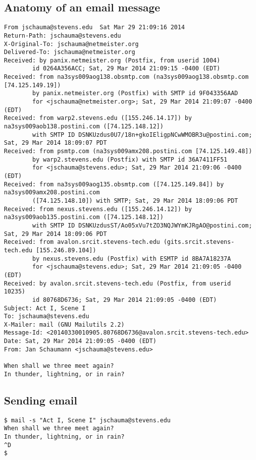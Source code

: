 \documentclass[xga]{xdvislides}
\begin{document}
\subsection{Anatomy of an email message}
\small
\begin{verbatim}
From jschauma@stevens.edu  Sat Mar 29 21:09:16 2014
Return-Path: jschauma@stevens.edu
X-Original-To: jschauma@netmeister.org
Delivered-To: jschauma@netmeister.org
Received: by panix.netmeister.org (Postfix, from userid 1004)
        id 0264A356ACC; Sat, 29 Mar 2014 21:09:15 -0400 (EDT)
Received: from na3sys009aog138.obsmtp.com (na3sys009aog138.obsmtp.com [74.125.149.19])
        by panix.netmeister.org (Postfix) with SMTP id 9F043356AAD
        for <jschauma@netmeister.org>; Sat, 29 Mar 2014 21:09:07 -0400 (EDT)
Received: from warp2.stevens.edu ([155.246.14.17]) by na3sys009aob138.postini.com ([74.125.148.12])
        with SMTP ID DSNKUzdus0U7/18n+gkoIEligpNCwWMOBR3u@postini.com; Sat, 29 Mar 2014 18:09:07 PDT
Received: from psmtp.com (na3sys009amx208.postini.com [74.125.149.48])
        by warp2.stevens.edu (Postfix) with SMTP id 36A7411FF51
        for <jschauma@stevens.edu>; Sat, 29 Mar 2014 21:09:06 -0400 (EDT)
Received: from na3sys009aog135.obsmtp.com ([74.125.149.84]) by na3sys009amx208.postini.com
        ([74.125.148.10]) with SMTP; Sat, 29 Mar 2014 18:09:06 PDT
Received: from nexus.stevens.edu ([155.246.14.12]) by na3sys009aob135.postini.com ([74.125.148.12])
        with SMTP ID DSNKUzdusST/Ao05xVu7tZO3NQJWYmKJRgAO@postini.com; Sat, 29 Mar 2014 18:09:06 PDT
Received: from avalon.srcit.stevens-tech.edu (gits.srcit.stevens-tech.edu [155.246.89.104])
        by nexus.stevens.edu (Postfix) with ESMTP id 8BA7A18237A
        for <jschauma@stevens.edu>; Sat, 29 Mar 2014 21:09:05 -0400 (EDT)
Received: by avalon.srcit.stevens-tech.edu (Postfix, from userid 10235)
        id 80768D6736; Sat, 29 Mar 2014 21:09:05 -0400 (EDT)
Subject: Act I, Scene I
To: jschauma@stevens.edu
X-Mailer: mail (GNU Mailutils 2.2)
Message-Id: <20140330010905.80768D6736@avalon.srcit.stevens-tech.edu>
Date: Sat, 29 Mar 2014 21:09:05 -0400 (EDT)
From: Jan Schaumann <jschauma@stevens.edu>

When shall we three meet again?
In thunder, lightning, or in rain?
\end{verbatim}
\Normalsize

\subsection{Sending email}
\begin{verbatim}
$ mail -s "Act I, Scene I" jschauma@stevens.edu
When shall we three meet again?
In thunder, lightning, or in rain?
^D
$
\end{verbatim}
\end{document}
